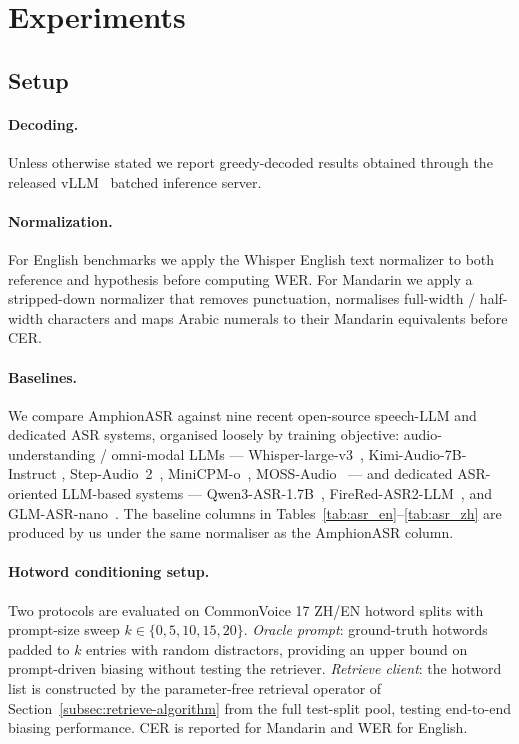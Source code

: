 \section{Experiments}
\label{sec:experiments}

\subsection{Setup}
\label{subsec:setup}

\paragraph{Decoding.}
Unless otherwise stated we report greedy-decoded results obtained
through the released vLLM~\cite{kwon2023vllm} batched inference
server.

\paragraph{Normalization.}
For English benchmarks we apply the Whisper English text normalizer
\cite{radford2023whisper} to both reference and hypothesis before
computing WER. For Mandarin we apply a stripped-down normalizer that
removes punctuation, normalises full-width / half-width characters
and maps Arabic numerals to their Mandarin equivalents before CER.

\paragraph{Baselines.}
We compare AmphionASR against nine recent open-source speech-LLM
and dedicated ASR systems, organised loosely by training objective:
audio-understanding / omni-modal LLMs ---
Whisper-large-v3~\cite{radford2023whisper}, Kimi-Audio-7B-Instruct
\cite{kimiaudio2025}, Step-Audio~2~\cite{stepaudio22025},
MiniCPM-o~\cite{minicpm2025}, MOSS-Audio~\cite{moss2026audio} --- and dedicated ASR-oriented
LLM-based systems --- Qwen3-ASR-1.7B~\cite{qwen2025qwen3asr},
FireRed-ASR2-LLM~\cite{fireredasr2025}, and
GLM-ASR-nano~\cite{glmasr2025}. The baseline columns in
Tables~\ref{tab:asr_en}--\ref{tab:asr_zh} are produced by us under
the same normaliser as the AmphionASR column.

\paragraph{Hotword conditioning setup.}
\label{subsec:hotword-setup}
Two protocols are evaluated on CommonVoice 17 ZH/EN hotword splits
with prompt-size sweep $k\!\in\!\{0, 5, 10, 15, 20\}$.
\emph{Oracle prompt}: ground-truth hotwords padded to $k$ entries
with random distractors, providing an upper bound on prompt-driven
biasing without testing the retriever.
\emph{Retrieve client}: the hotword list is constructed by the
parameter-free retrieval operator of Section~\ref{subsec:retrieve-algorithm}
from the full test-split pool, testing end-to-end biasing performance.
CER is reported for Mandarin and WER for English.

